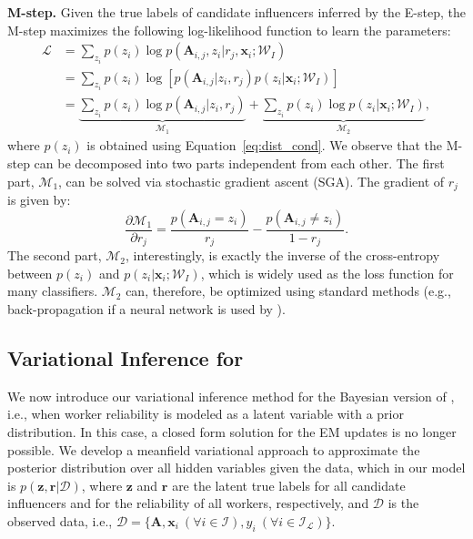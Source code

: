 \smallskip
\noindent\textbf{M-step.}
Given the true labels of candidate influencers inferred by the E-step, the M-step maximizes the following log-likelihood function to learn the parameters:
\begin{align}
   \mathcal{L} 
    &=\sum_{z_i}p(z_i)\log p(\mathbf{A}_{i,j},z_i|r_j,\mathbf{x}_i;\mathcal{W}_I)\nonumber\\
    &=\sum_{z_i}p(z_i)\log [p(\mathbf{A}_{i,j}| z_i , r_j)  p(z_i |\mathbf{x}_i;\mathcal{W}_I)] \label{eq:likelihood_m}\\
    &=\underbrace{\sum_{z_i}p(z_i) \log p(\mathbf{A}_{i,j}| z_i , r_j)}_{\mathcal{M}_1}
    +\underbrace{\sum_{z_i}p(z_i)\log p(z_i |\mathbf{x}_i;\mathcal{W}_I)}_{\mathcal{M}_2},
    \nonumber
\end{align}
where $p(z_i)$ is obtained using Equation~\ref{eq:dist_cond}. We observe that the M-step can be decomposed into two parts independent from each other. The first part, $\mathcal{M}_1$, can be solved via stochastic gradient ascent (SGA). The gradient of $r_j$ is given by:
%
\begin{equation}
    \frac{\partial \mathcal{M}_1}{\partial r_j}=\frac{p(\mathbf{A}_{i,j}=z_i)}{r_j}-\frac{p(\mathbf{A}_{i,j}\neq z_i)}{1-r_j}.
    \label{eq:grad_rj}
\end{equation}
%
The second part, $\mathcal{M}_2$, interestingly, is exactly the inverse of the cross-entropy between $p(z_i)$ and $p(z_i |\mathbf{x}_i;\mathcal{W}_I)$, which is widely used as the loss function for many classifiers. $\mathcal{M}_2$ can, therefore, be optimized using standard methods (e.g., back-propagation if a neural network is used by \sys).

\subsection{Variational Inference for \sys}
\label{sec:vi}

We now introduce our variational inference method for the Bayesian version of \sys, i.e., when worker reliability is modeled as a latent variable with a prior distribution. In this case, a closed form solution for the EM updates is no longer possible. We develop a meanfield variational approach to approximate the posterior distribution over all hidden variables given the data, which in our model is $p(\mathbf{z},\mathbf{r} | \mathcal{D})$, where $\mathbf{z}$ and $\mathbf{r}$ are the latent true labels for all candidate influencers and for the reliability of all workers, respectively, and $\mathcal{D}$ is the observed data, i.e., $\mathcal{D}=\{\mathbf{A}, \mathbf{x}_i\ (\forall i\in\mathcal{I}), y_i\ (\forall i\in \mathcal{I_L})\}$. 


